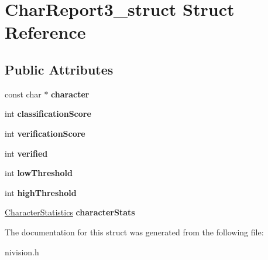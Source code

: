 \hypertarget{structCharReport3__struct}{\section{\-Char\-Report3\-\_\-struct \-Struct \-Reference}
\label{structCharReport3__struct}
}
\subsection*{\-Public \-Attributes}
\begin{DoxyCompactItemize}
\item 
\hypertarget{structCharReport3__struct_a22c590ceca332193c8b275545dbe3b0f}{const char $\ast$ {\bfseries character}}\label{structCharReport3__struct_a22c590ceca332193c8b275545dbe3b0f}

\item 
\hypertarget{structCharReport3__struct_abcb5d86d5d0e7882bb29f531a039549a}{int {\bfseries classification\-Score}}\label{structCharReport3__struct_abcb5d86d5d0e7882bb29f531a039549a}

\item 
\hypertarget{structCharReport3__struct_a3a7883ae8ce8ab3b861c08bfcde1a5f8}{int {\bfseries verification\-Score}}\label{structCharReport3__struct_a3a7883ae8ce8ab3b861c08bfcde1a5f8}

\item 
\hypertarget{structCharReport3__struct_a1a2f3410a94439c0752c8c41656bffd1}{int {\bfseries verified}}\label{structCharReport3__struct_a1a2f3410a94439c0752c8c41656bffd1}

\item 
\hypertarget{structCharReport3__struct_aa57a3a6d78541ef917cd605094674fbd}{int {\bfseries low\-Threshold}}\label{structCharReport3__struct_aa57a3a6d78541ef917cd605094674fbd}

\item 
\hypertarget{structCharReport3__struct_a559aeac2211bc188b00d834a76b76d2b}{int {\bfseries high\-Threshold}}\label{structCharReport3__struct_a559aeac2211bc188b00d834a76b76d2b}

\item 
\hypertarget{structCharReport3__struct_ae5d57c357e34884488efd530b64ec29c}{\hyperlink{structCharacterStatistics__struct}{\-Character\-Statistics} {\bfseries character\-Stats}}\label{structCharReport3__struct_ae5d57c357e34884488efd530b64ec29c}

\end{DoxyCompactItemize}


\-The documentation for this struct was generated from the following file\-:\begin{DoxyCompactItemize}
\item 
nivision.\-h\end{DoxyCompactItemize}
